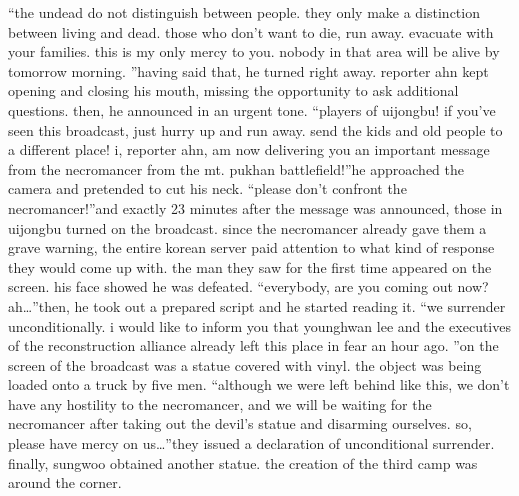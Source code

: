 “the undead do not distinguish between people.
 they only make a distinction between living and dead.
 those who don’t want to die, run away.
 evacuate with your families.
 this is my only mercy to you.
 nobody in that area will be alive by tomorrow morning.
”having said that, he turned right away.
 reporter ahn kept opening and closing his mouth, missing the opportunity to ask additional questions.
then, he announced in an urgent tone.
“players of uijongbu! if you’ve seen this broadcast, just hurry up and run away.
 send the kids and old people to a different place! i, reporter ahn, am now delivering you an important message from the necromancer from the mt.
 pukhan battlefield!”he approached the camera and pretended to cut his neck.
“please don’t confront the necromancer!”and exactly 23 minutes after the message was announced, those in uijongbu turned on the broadcast.
since the necromancer already gave them a grave warning, the entire korean server paid attention to what kind of response they would come up with.
the man they saw for the first time appeared on the screen.
his face showed he was defeated.
“everybody, are you coming out now? ah…”then, he took out a prepared script and he started reading it.
“we surrender unconditionally.
 i would like to inform you that younghwan lee and the executives of the reconstruction alliance already left this place in fear an hour ago.
”on the screen of the broadcast was a statue covered with vinyl.
 the object was being loaded onto a truck by five men.
“although we were left behind like this, we don’t have any hostility to the necromancer, and we will be waiting for the necromancer after taking out the devil’s statue and disarming ourselves.
 so, please have mercy on us…”they issued a declaration of unconditional surrender.
finally, sungwoo obtained another statue.
the creation of the third camp was around the corner.


 